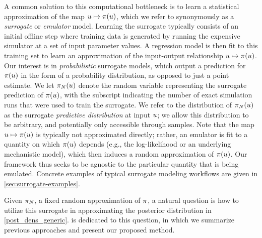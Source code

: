 \documentclass[12pt]{article}
\begin{document}
A common solution to this computational bottleneck is to learn a statistical approximation of the map 
$\Par \mapsto \postDens(\Par)$, which we refer to synonymously as a \textit{surrogate} or \textit{emulator}
model. Learning the surrogate typically consists of an initial offline step where training data 
is generated by running the expensive simulator at a set of input parameter values. A regression model 
is then fit to this training set to learn an approximation of the input-output relationship 
$\Par \mapsto \postDens(\Par)$. Our interest is in \textit{probabilistic} surrogate models, which output
a prediction for $\postDens(\Par)$ in the form of a probability distribution, as opposed to just a point estimate.
We let $\postEm[\Ndesign](\Par)$ denote the random variable representing the surrogate prediction 
of $\postDens(\Par)$, with the subscript indicating the number of exact simulation runs that were used 
to train the surrogate. We refer to the distribution of $\postEm[\Ndesign](\Par)$ as the surrogate 
\textit{predictive distribution} at input $\Par$; we allow this distribution to be arbitrary, and potentially 
only accessible through samples. Note that the map $\Par \mapsto \postDens(\Par)$ is typically not 
approximated directly; rather, an emulator is fit to a quantity on which $\postDens(\Par)$ depends 
(e.g., the log-likelihood or an underlying mechanistic model), which then induces a random approximation 
of $\postDens(\Par)$. Our framework thus seeks to be agnostic to the particular quantity that is 
being emulated. Concrete examples of typical surrogate modeling workflows are given in \cref{sec:surrogate-examples}.

Given $\postEm[\Ndesign]$, a fixed random approximation of $\postDens$, a natural question is how to 
utilize this surrogate in approximating the posterior distribution in \cref{post_dens_generic}. 
is dedicated to this question, in which we summarize previous approaches and present our proposed method.
\end{document}
